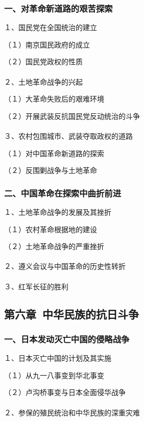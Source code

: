 \documentclass{ctexart}
\begin{document}
\subsubsection{一、对革命新道路的艰苦探索}

１、国民党在全国统治的建立

（１）南京国民政府的成立

（２）国民党政权的性质
\\\\

２、土地革命战争的兴起

（１）大革命失败后的艰难环境

（２）开展武装反抗国民党反动统治的斗争
\\\\

３、农村包围城市、武装夺取政权的道路

（１）对中国革命新道路的探索

（２）反围剿战争与土地革命

\subsubsection{二、中国革命在探索中曲折前进}

１、土地革命战争的发展及其挫折

（１）农村革命根据地的建设

（２）土地革命战争的严重挫折
\\\\

２、遵义会议与中国革命的历史性转折
\\\\

３、红军长征的胜利

\subsection{第六章\ 中华民族的抗日斗争}

\subsubsection{一、日本发动灭亡中国的侵略战争}

１、日本灭亡中国的计划及其实施

（１）从九一八事变到华北事变

（２）卢沟桥事变与日本全面侵华战争
\\\\

２、参保的殖民统治和中华民族的深重灾难
\end{document}
